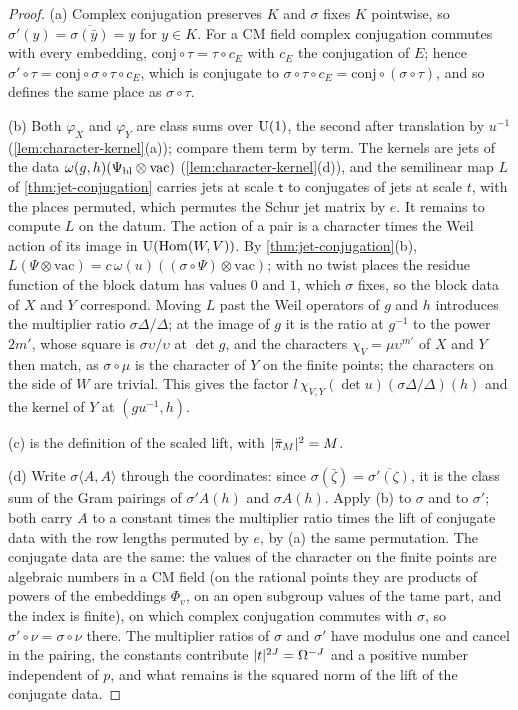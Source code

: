 \begin{proof}
(a) Complex conjugation preserves $K$ and $\sigma$ fixes $K$ pointwise, so $\sigma'(y)=\overline{\sigma(\bar y)}=y$ for $y\in K$. For a CM field complex conjugation commutes with every embedding, $\mathrm{conj}\circ\tau=\tau\circ c_E$ with $c_E$ the
conjugation of $E$; hence $\sigma'\circ\tau=\mathrm{conj}\circ\sigma\circ\tau\circ c_E$, which is conjugate to $\sigma\circ\tau\circ c_E=\mathrm{conj}\circ(\sigma\circ\tau)$, and so defines the same place as $\sigma\circ\tau$.

(b) Both $\varphi_X$ and $\varphi_Y$ are class sums over $\operatorname{U}(1)$, the second after translation by $u^{-1}$ (\cref{lem:character-kernel}(a)); compare them term by term. The kernels are jets of the data $\omega(g,h)(\Psi_{\rm bl}\otimes\mathrm{vac})$
(\cref{lem:character-kernel}(d)), and the semilinear map $L$ of \cref{thm:jet-conjugation} carries jets at scale $\mathsf t$ to conjugates of jets at scale $t$, with the places permuted, which permutes the Schur jet matrix by $e$.
It remains to compute $L$ on the datum. The action of a pair is a character times the Weil action of its image in $\operatorname{U}(\operatorname{Hom}(W,V))$. By \cref{thm:jet-conjugation}(b), $L(\Psi\otimes\mathrm{vac})=c\,\omega(u)((\sigma\circ\Psi)\otimes\mathrm{vac})$; with no twist
places the residue function of the block datum has values $0$ and $1$, which $\sigma$ fixes, so the block data of $X$ and $Y$ correspond. Moving $L$ past the Weil operators of $g$ and $h$ introduces the multiplier ratio
$\sigma\Delta/\Delta$; at the image of $g$ it is the ratio at $g^{-1}$ to the power $2m'$, whose square is $\sigma\upsilon/\upsilon$ at $\det g$, and the characters $\chi_V=\mu\upsilon^{m'}$ of $X$ and $Y$ then match, as $\sigma\circ\mu$ is the
character of $Y$ on the finite points; the characters on the side of $W$ are trivial. This gives the factor $l\,\chi_{V,Y}(\det u)(\sigma\Delta/\Delta)(h)$ and the kernel of $Y$ at $(gu^{-1},h)$.

(c) is the definition of the scaled lift, with $\lvert \bar\pi_M\rvert^2=M$.

(d) Write $\sigma\langle A,A\rangle$ through the coordinates: since $\sigma(\bar\zeta)=\overline{\sigma'(\zeta)}$, it is the class sum of the Gram pairings of $\sigma'A(h)$ and $\sigma A(h)$. Apply (b) to $\sigma$ and to $\sigma'$; both carry $A$ to a constant times the
multiplier ratio times the lift of conjugate data with the row lengths permuted by $e$, by (a) the same permutation. The conjugate data are the same: the values of the character on the finite points are algebraic
numbers in a CM field (on the rational points they are products of powers of the embeddings $\Phi_v$, on an open subgroup values of the tame part, and the index is finite), on which complex conjugation
commutes with $\sigma$, so $\sigma'\circ\nu=\sigma\circ\nu$ there. The multiplier ratios of $\sigma$ and $\sigma'$ have modulus one and cancel in the pairing, the constants
contribute $\lvert t\rvert^{2J}=\Omega^{-J}$ and a positive number independent of $p$, and what remains is the squared norm of the lift of the conjugate data.
\end{proof}

